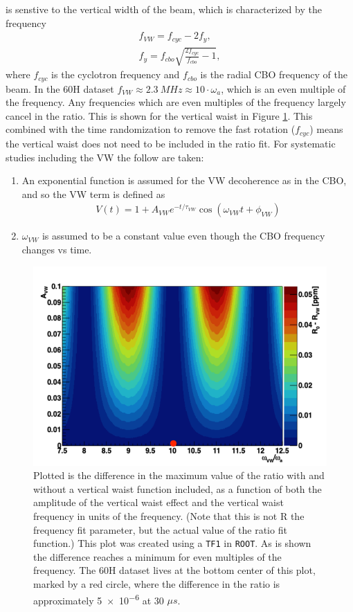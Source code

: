 	\wa is senstive to the vertical width of the beam, which is characterized by the frequency 
		\begin{gather}
			f_{VW} = f_{cyc} - 2f_{y}, \\
			f_{y} = f_{cbo} \sqrt{\frac{2f_{cyc}}{f_{cbo}} - 1},
		\end{gather}
	where $f_{cyc}$ is the cyclotron frequency and $f_{cbo}$ is the radial CBO frequency of the beam. In the 60H dataset $f_{VW} \approx \SI{2.3}{MHz} \approx 10 \cdot \omega_{a}$, which is an even multiple of the \gmtwo frequency. Any frequencies which are even multiples of the \gmtwo frequency largely cancel in the ratio. This is shown for the vertical waist in Figure \ref{fig:VWPlot}. This combined with the time randomization to remove the fast rotation ($f_{cyc}$) means the vertical waist does not need to be included in the ratio fit. For systematic studies including the VW the follow are taken:
		\begin{enumerate}
			\item{An exponential function is assumed for the VW decoherence as in the CBO, and so the VW term is defined as
				\begin{gather}
						V(t) = 1 + A_{VW} e^{-t/\tau_{VW}} \cos(\omega_{VW}t + \phi_{VW})
				\end{gather}
			}
			\item{$\omega_{VW}$ is assumed to be a constant value even though the CBO frequency changes vs time.}
		\end{enumerate}

	\begin{figure}[]
		\centering
		\includegraphics[width=\textwidth]{VWPlot}
	    \caption[VWPlot]{Plotted is the difference in the maximum value of the ratio with and without a vertical waist function included, as a function of both the amplitude of the vertical waist effect and the vertical waist frequency in units of the \gmtwo frequency. (Note that this is not R the frequency fit parameter, but the actual value of the ratio fit function.) This plot was created using a \texttt{TF1} in \texttt{ROOT}. As is shown the difference reaches a minimum for even multiples of the \gmtwo frequency. The 60H dataset lives at the bottom center of this plot, marked by a red circle, where the difference in the ratio is approximately \SI{5e-6}{} at 30 $\mu s$.}
	    \label{fig:VWPlot}
	\end{figure}

